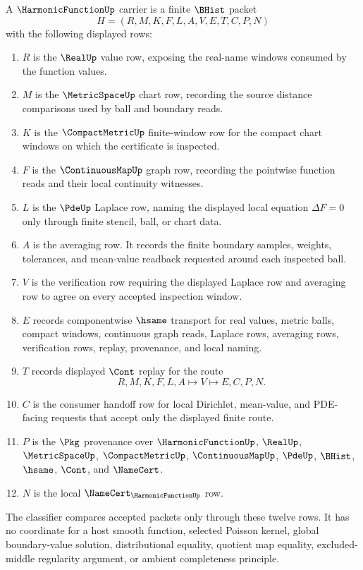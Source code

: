 \begin{definition}
\label{def:harmonic-function-carrier}
A $\HarmonicFunctionUp$ carrier is a finite $\BHist$ packet
$$
H=(R,M,K,F,L,A,V,E,T,C,P,N)
$$
with the following displayed rows:
\begin{enumerate}
\item $R$ is the $\RealUp$ value row, exposing the real-name windows consumed by the function values.
\item $M$ is the $\MetricSpaceUp$ chart row, recording the source distance comparisons used by ball and boundary reads.
\item $K$ is the $\CompactMetricUp$ finite-window row for the compact chart windows on which the certificate is inspected.
\item $F$ is the $\ContinuousMapUp$ graph row, recording the pointwise function reads and their local continuity witnesses.
\item $L$ is the $\PdeUp$ Laplace row, naming the displayed local equation $\Delta F=0$ only through finite stencil, ball, or chart data.
\item $A$ is the averaging row. It records the finite boundary samples, weights, tolerances, and mean-value readback requested around each inspected ball.
\item $V$ is the verification row requiring the displayed Laplace row and averaging row to agree on every accepted inspection window.
\item $E$ records componentwise $\hsame$ transport for real values, metric balls, compact windows, continuous graph reads, Laplace rows, averaging rows, verification rows, replay, provenance, and local naming.
\item $T$ records displayed $\Cont$ replay for the route
$$
R,M,K,F,L,A \longmapsto V \longmapsto E,C,P,N .
$$
\item $C$ is the consumer handoff row for local Dirichlet, mean-value, and PDE-facing requests that accept only the displayed finite route.
\item $P$ is the $\Pkg$ provenance over $\HarmonicFunctionUp$, $\RealUp$, $\MetricSpaceUp$, $\CompactMetricUp$, $\ContinuousMapUp$, $\PdeUp$, $\BHist$, $\hsame$, $\Cont$, and $\NameCert$.
\item $N$ is the local $\NameCert_{\HarmonicFunctionUp}$ row.
\end{enumerate}
The classifier compares accepted packets only through these twelve rows. It has no coordinate for a host smooth function, selected Poisson kernel, global boundary-value solution, distributional equality, quotient map equality, excluded-middle regularity argument, or ambient completeness principle.
\end{definition}

